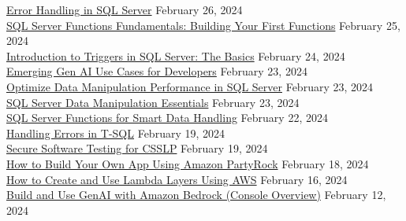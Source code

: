 \documentclass[10pt]{res} %
\begin{document}
\begin{resume}
\href{https://bjdelacruz.dev/files/certificates/pluralsight/Error_Handling_in_SQL_Server.pdf}{\color{blue}Error Handling in SQL Server} \hfill February 26, 2024 \\
\href{https://bjdelacruz.dev/files/certificates/pluralsight/SQL_Server_Functions_Fundamentals_-_Building_Your_First_Functions.pdf}{\color{blue}SQL Server Functions Fundamentals: Building Your First Functions} \hfill February 25, 2024 \\
\href{https://bjdelacruz.dev/files/certificates/pluralsight/Introduction_to_Triggers_in_SQL_Server_-_The_Basics.pdf}{\color{blue}Introduction to Triggers in SQL Server: The Basics} \hfill February 24, 2024 \\
\href{https://bjdelacruz.dev/files/certificates/pluralsight/Emerging_Gen_AI_Use_Cases_for_Developers.pdf}{\color{blue}Emerging Gen AI Use Cases for Developers} \hfill February 23, 2024 \\
\href{https://bjdelacruz.dev/files/certificates/pluralsight/Optimize_Data_Manipulation_Performance_in_SQL_Server.pdf}{\color{blue}Optimize Data Manipulation Performance in SQL Server} \hfill February 23, 2024 \\
\href{https://bjdelacruz.dev/files/certificates/pluralsight/SQL_Server_Data_Manipulation_Essentials.pdf}{\color{blue}SQL Server Data Manipulation Essentials} \hfill February 23, 2024 \\
\href{https://bjdelacruz.dev/files/certificates/pluralsight/SQL_Server_Functions_for_Smart_Data_Handling.pdf}{\color{blue}SQL Server Functions for Smart Data Handling} \hfill February 22, 2024 \\
\href{https://bjdelacruz.dev/files/certificates/pluralsight/Handling_Errors_in_T-SQL.pdf}{\color{blue}Handling Errors in T-SQL} \hfill February 19, 2024 \\
\href{https://bjdelacruz.dev/files/certificates/pluralsight/Secure_Software_Testing_for_CSSLP.pdf}{\color{blue}Secure Software Testing for CSSLP\textsuperscript{\textregistered}} \hfill February 19, 2024 \\
\href{https://bjdelacruz.dev/files/certificates/pluralsight/How_to_Build_Your_Own_App_Using_Amazon_PartyRock.pdf}{\color{blue}How to Build Your Own App Using Amazon PartyRock} \hfill February 18, 2024 \\
\href{https://bjdelacruz.dev/files/certificates/pluralsight/How_to_Create_and_Use_Lambda_Layers_Using_AWS.pdf}{\color{blue}How to Create and Use Lambda Layers Using AWS} \hfill February 16, 2024 \\
\href{https://bjdelacruz.dev/files/certificates/pluralsight/Build_and_Use_GenAI_with_Amazon_Bedrock.pdf}{\color{blue}Build and Use GenAI with Amazon Bedrock (Console Overview)} \hfill February 12, 2024 \\

\end{resume}
\end{document}
